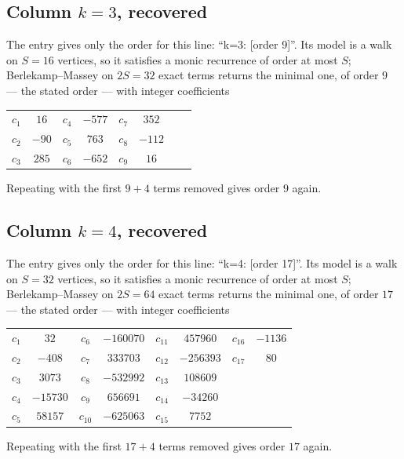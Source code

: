 \documentclass[11pt,a4paper]{article}
\theoremstyle{plain}
\theoremstyle{definition}
\begin{document}
\subsection*{Column $k=3$, recovered}
The entry gives only the order for this line: ``k=3: [order 9]''. Its model is a walk on
$S=16$ vertices, so it satisfies a monic recurrence of order at most $S$;
Berlekamp--Massey on $2S=32$ exact terms returns the minimal one, of order
$9$ --- the stated order --- with integer coefficients
\begin{center}\small\begin{tabular}{cccccccc}
$c_{1}$ & $16$ & $c_{4}$ & $-577$ & $c_{7}$ & $352$ &  &  \\
$c_{2}$ & $-90$ & $c_{5}$ & $763$ & $c_{8}$ & $-112$ &  &  \\
$c_{3}$ & $285$ & $c_{6}$ & $-652$ & $c_{9}$ & $16$ &  &  \\
\end{tabular}\end{center}
Repeating with the first $9+4$ terms removed gives order $9$ again.

\subsection*{Column $k=4$, recovered}
The entry gives only the order for this line: ``k=4: [order 17]''. Its model is a walk on
$S=32$ vertices, so it satisfies a monic recurrence of order at most $S$;
Berlekamp--Massey on $2S=64$ exact terms returns the minimal one, of order
$17$ --- the stated order --- with integer coefficients
\begin{center}\small\begin{tabular}{cccccccc}
$c_{1}$ & $32$ & $c_{6}$ & $-160070$ & $c_{11}$ & $457960$ & $c_{16}$ & $-1136$ \\
$c_{2}$ & $-408$ & $c_{7}$ & $333703$ & $c_{12}$ & $-256393$ & $c_{17}$ & $80$ \\
$c_{3}$ & $3073$ & $c_{8}$ & $-532992$ & $c_{13}$ & $108609$ &  &  \\
$c_{4}$ & $-15730$ & $c_{9}$ & $656691$ & $c_{14}$ & $-34260$ &  &  \\
$c_{5}$ & $58157$ & $c_{10}$ & $-625063$ & $c_{15}$ & $7752$ &  &  \\
\end{tabular}\end{center}
Repeating with the first $17+4$ terms removed gives order $17$ again.
\end{document}
